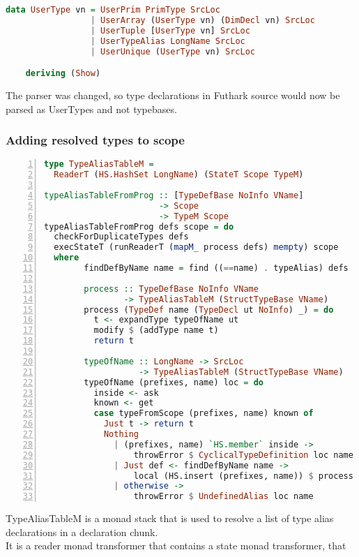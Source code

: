 \begin{lstlisting}[language=Haskell]
data UserType vn = UserPrim PrimType SrcLoc
                 | UserArray (UserType vn) (DimDecl vn) SrcLoc
                 | UserTuple [UserType vn] SrcLoc
                 | UserTypeAlias LongName SrcLoc
                 | UserUnique (UserType vn) SrcLoc

    deriving (Show)
\end{lstlisting}
\noindent
The parser was changed, so type declarations in Futhark source would now be parsed as UserTypes and not
typebases.
\pagebreak
\subsubsection{Adding resolved types to scope}\label{typealiasingcode}
\begin{lstlisting}[language=Haskell, numbers=left]
  type TypeAliasTableM =
  ReaderT (HS.HashSet LongName) (StateT Scope TypeM)

typeAliasTableFromProg :: [TypeDefBase NoInfo VName]
                       -> Scope
                       -> TypeM Scope
typeAliasTableFromProg defs scope = do
  checkForDuplicateTypes defs
  execStateT (runReaderT (mapM_ process defs) mempty) scope
  where
        findDefByName name = find ((==name) . typeAlias) defs

        process :: TypeDefBase NoInfo VName
                -> TypeAliasTableM (StructTypeBase VName)
        process (TypeDef name (TypeDecl ut NoInfo) _) = do
          t <- expandType typeOfName ut
          modify $ (addType name t)
          return t

        typeOfName :: LongName -> SrcLoc
                   -> TypeAliasTableM (StructTypeBase VName)
        typeOfName (prefixes, name) loc = do
          inside <- ask
          known <- get
          case typeFromScope (prefixes, name) known of
            Just t -> return t
            Nothing
              | (prefixes, name) `HS.member` inside ->
                  throwError $ CyclicalTypeDefinition loc name
              | Just def <- findDefByName name ->
                  local (HS.insert (prefixes, name)) $ process def
              | otherwise ->
                  throwError $ UndefinedAlias loc name
\end{lstlisting}
\noindent
TypeAliasTableM is a monad stack that is used to resolve a list of type alias
declarations in a declaration chunk. \\
It is a reader monad transformer that contains a state monad transformer, that
